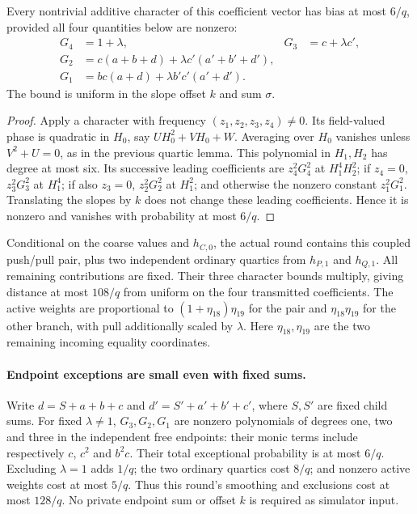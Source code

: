 \begin{lemma}
Every nontrivial additive character of this coefficient vector has bias at most $6/q$, provided all four quantities below are nonzero:
\[
\begin{aligned}
 G_4&=1+\lambda, &G_3&=c+\lambda c',\\
 G_2&=c(a+b+d)+\lambda c'(a'+b'+d'),\\
 G_1&=bc(a+d)+\lambda b'c'(a'+d').
\end{aligned}
\]
The bound is uniform in the slope offset $k$ and sum $\sigma$.
\end{lemma}
\begin{proof}
Apply a character with frequency $(z_1,z_2,z_3,z_4)\ne0$. Its field-valued phase is quadratic in $H_0$, say $UH_0^2+VH_0+W$. Averaging over $H_0$ vanishes unless $V^2+U=0$, as in the previous quartic lemma. This polynomial in $H_1,H_2$ has degree at most six. Its successive leading coefficients are $z_4^2G_4^2$ at $H_1^4H_2^2$; if $z_4=0$, $z_3^2G_3^2$ at $H_1^4$; if also $z_3=0$, $z_2^2G_2^2$ at $H_1^2$; and otherwise the nonzero constant $z_1^2G_1^2$. Translating the slopes by $k$ does not change these leading coefficients. Hence it is nonzero and vanishes with probability at most $6/q$.
\end{proof}

Conditional on the coarse values and $h_{C,0}$, the actual round contains this coupled push/pull pair, plus two independent ordinary quartics from $h_{P,1}$ and $h_{Q,1}$. All remaining contributions are fixed. Their three character bounds multiply, giving distance at most $108/q$ from uniform on the four transmitted coefficients. The active weights are proportional to $(1+\eta_{18})\eta_{19}$ for the pair and $\eta_{18}\eta_{19}$ for the other branch, with pull additionally scaled by $\lambda$. Here $\eta_{18},\eta_{19}$ are the two remaining incoming equality coordinates.

\paragraph{Endpoint exceptions are small even with fixed sums.} Write $d=S+a+b+c$ and $d'=S'+a'+b'+c'$, where $S,S'$ are fixed child sums. For fixed $\lambda\ne1$, $G_3,G_2,G_1$ are nonzero polynomials of degrees one, two and three in the independent free endpoints: their monic terms include respectively $c$, $c^2$ and $b^2c$. Their total exceptional probability is at most $6/q$. Excluding $\lambda=1$ adds $1/q$; the two ordinary quartics cost $8/q$; and nonzero active weights cost at most $5/q$. Thus this round's smoothing and exclusions cost at most $128/q$. No private endpoint sum or offset $k$ is required as simulator input.

